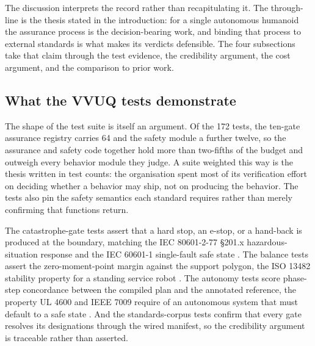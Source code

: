 
The discussion interprets the record rather than recapitulating it. The
through-line is the thesis stated in the introduction: for a single autonomous
humanoid the assurance process is the decision-bearing work, and binding that
process to external standards is what makes its verdicts defensible. The four
subsections take that claim through the test evidence, the credibility argument,
the cost argument, and the comparison to prior work.

\subsection{What the VVUQ tests demonstrate}

The shape of the test suite is itself an argument. Of the 172 tests, the
ten-gate assurance registry carries 64 and the safety module a further twelve, so
the assurance and safety code together hold more than two-fifths of the budget
and outweigh every behavior module they judge. A suite weighted this way is the
thesis written in test counts: the organisation spent most of its verification
effort on deciding whether a behavior may ship, not on producing the behavior.
The tests also pin the safety semantics each standard requires rather than merely
confirming that functions return. 

The catastrophe-gate tests assert that a hard
stop, an e-stop, or a hand-back is produced at the boundary, matching the IEC
80601-2-77 \S201.x hazardous-situation response and the IEC 60601-1 single-fault
safe state \cite{iec8060127, iec60601}. The balance tests assert the
zero-moment-point margin against the support polygon, the ISO 13482 stability
property for a standing service robot \cite{iso13482}. The autonomy tests score
phase-step concordance between the compiled plan and the annotated reference, the
property UL 4600 and IEEE 7009 require of an autonomous system that must default
to a safe state \cite{ul4600, ieee7009}. And the standards-corpus tests confirm
that every gate resolves its designations through the wired manifest,
so the credibility argument is traceable rather than asserted.

